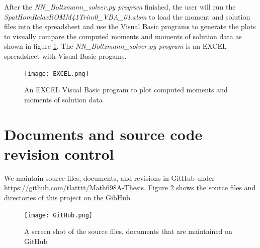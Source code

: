 \documentclass{article}
\begin{document}
After the \emph{NN\_Boltzmann\_solver.py program} finished, the user will run the \emph{SpatHomRelaxROMM41Trim0\_VBA\_01.xlsm} to load the moment and solution files into the spreadsheet and use the Visual Basic programs to generate the plots to visually compare the computed moments and moments of solution data as shown in figure \ref{fig:EXCEL}. The \emph{NN\_Boltzmann\_solver.py program} is an EXCEL spreadsheet  with Visual Basic progams.

\begin{figure}[h!]
	\centering
	\texttt{[image: EXCEL.png]}
	\caption{An EXCEL Visual Basic program to plot computed moments and moments of solution data}
	\label{fig:EXCEL}
\end{figure}
 
\section{Documents and source code revision control}
We maintain source files, documents, and revisions in GitHub under \\ \href{https://github.com/tlatttt/Math698A-Thesis}{https://github.com/tlatttt/Math698A-Thesis}. Figure \ref{fig:GitHub} shows the source files and directories of this project on the GibHub. 
\begin{figure}[h!]
	\centering
	\texttt{[image: GitHub.png]}
	\caption{A screen shot of the source files, documents that are maintained on GitHub}
	\label{fig:GitHub}
\end{figure}
\end{document}
